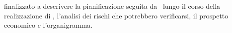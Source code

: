  finalizzato a descrivere la pianificazione seguita da \gruppo\ lungo il corso della realizzazione di \progetto, l'analisi dei rischi che potrebbero verificarsi, il prospetto economico e l'organigramma.